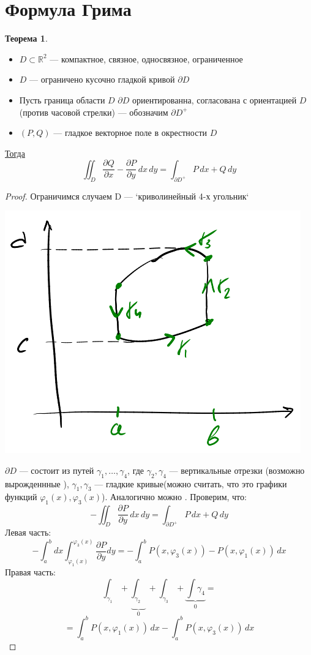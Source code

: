 \documentclass[english]{article}
\newcommand{\R}{\mathbb{R}}
\newcommand{\fixme}{{\color{red}\fbox{\text{Исправить}}}}
\theoremstyle{plain}
\theoremstyle{remark}
\theoremstyle{definition}
\newtheorem{theorem}{Теорема}[section]
\begin{document}
\section{Формула Грима}
\label{sec:org560a60e}
\begin{theorem}
\-
\begin{itemize}
\item \(D \subset \R^2\) --- компактное, связное, односвязное, ограниченное
\item \(D\) --- ограничено кусочно гладкой кривой \(\partial D\)
\item Пусть граница области \(D\) \(\partial D\) ориентированна, согласована с ориентацией \(D\) (против часовой стрелки) --- обозначим \(\partial D^+\)
\item \((P, Q)\) --- гладкое векторное поле в окрестности \(D\)
\end{itemize}
\uline{Тогда} \[ \iint_D \frac{\partial Q}{\partial x} - \frac{\partial P}{\partial y}\,dx\,dy = \int_{\partial D^+} P\,dx + Q\,dy \]
\end{theorem}
\begin{proof}
Ограничимся случаем D --- `криволинейный 4-х угольник`
\begin{center}
\includegraphics[scale=0.4]{9_1.png}
\end{center}
\(\partial D\) --- состоит из путей \(\gamma_1, \dots, \gamma_4\), где \(\gamma_2, \gamma_4\) --- вертикальные отрезки (возможно вырожденнные ), \(\gamma_1, \gamma_3\) --- гладкие кривые(можно считать, что это графики функций \(\varphi_1(x), \varphi_3(x)\)). Аналогично можно \fixme.
Проверим, что:
\[ - \iint_D \frac{\partial P}{\partial y}\,dx\,dy = \int_{\partial D^+} P\,dx + Q\,dy \]
Левая часть:
\[ - \int_a^b dx \int_{\varphi_1(x)}^{\varphi_3(x)} \frac{\partial P}{\partial y} dy = - \int_a^b P(x, \varphi_3(x)) - P(x, \varphi_1(x)) \,dx \]
Правая часть:
\[ \int_{\gamma_1} + \underbrace{\int_{\gamma_2}}_0 + \int_{\gamma_3} + \underbrace{\int{\gamma_4}}_0 =  \]
\[ = \int_a^b P(x, \varphi_1(x))\,dx - \int_a^b P(x, \varphi_3(x))\, dx \]
\end{proof}
\end{document}
